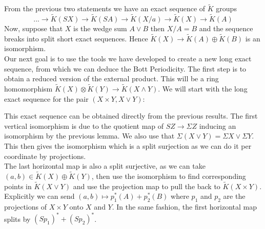\documentclass[../Thesis.tex]{subfiles}
\begin{document}
From the previous two statements we have an exact sequence of $\tilde{K}$ groups
\begin{equation}
 ...\rightarrow \tilde{K}(SX) \rightarrow \tilde{K}(SA) \rightarrow \tilde{K}(X/a) \rightarrow \tilde{K}(X) \rightarrow \tilde{K}(A)
 \end{equation}
Now, suppose that $X$ is the wedge sum $A \vee B$ then $X/A = B $ and the sequence breaks into split short exact sequences. Hence $\tilde{K}(X) \rightarrow \tilde{K}(A)\oplus \tilde{K}(B)$ is an isomorphism.
\\Our next goal is to use the tools we have developed to create a new long exact sequence, from which we can deduce the Bott Periodicity. The first step is to obtain a reduced version of the external product. This will be a ring homomorphism $\tilde{K}(X) \otimes \tilde{K}(Y) \rightarrow \tilde{K}(X \wedge Y)$. We will start with the long exact sequence for the pair $(X \times Y, X \vee Y)$:
\\\begin{center}

\end{center}
This exact sequence can be obtained directly from the previous results. The first vertical isomorphism is due to the quotient map of $SZ \rightarrow \Sigma Z$ inducing an isomorphism by the previous lemma. We also use that $\Sigma(X \vee Y) = \Sigma X \vee \Sigma Y$. This then gives the isomorphism which is a split surjection as we can do it per coordinate by projections.
\\The last horizontal map is also a split surjective, as we can take $(a,b) \in \tilde{K}(X) \oplus \tilde{K}(Y)$, then use the isomorphism to find corresponding points in $\tilde{K}(X \vee Y)$ and use the projection map to pull the back to $\tilde{K}(X \times Y)$. Explicitly we can send $(a,b) \mapsto p_1^*(A) + p_2^*(B)$ where $p_1$ and $p_2$ are the projections of $X \times Y$ onto $X$ and $Y$. In the same fashion, the first horizontal map splits by $(Sp_1)^* + (Sp_2)^*$.
\end{document}
